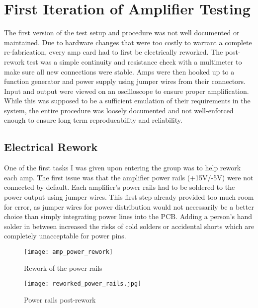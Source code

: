 %
%
\chapter{First Iteration of Amplifier Testing}
The first version of the test setup and procedure was not well documented or maintained. Due to hardware changes that were too costly to warrant a complete re-fabrication, every amp card had to first be electrically reworked. The post-rework test was a simple continuity and resistance check with a multimeter to make sure all new connections were stable. Amps were then hooked up to a function generator and power supply using jumper wires from their connectors. Input and output were viewed on an oscilloscope to ensure proper amplification. While this was supposed to be a sufficient emulation of their requirements in the system, the entire procedure was loosely documented and not well-enforced enough to ensure long term reproducability and reliability.
\section{Electrical Rework}
One of the first tasks I was given upon entering the group was to help rework each amp. The first issue was that the amplifier power rails (+15V/-5V) were not connected by default. Each amplifier's power rails had to be soldered to the power output using jumper wires. This first step already provided too much room for error, as jumper wires for power distribution would not necessarily be a better choice than simply integrating power lines into the PCB. Adding a person's hand solder in between increased the risks of cold solders or accidental shorts which are completely unacceptable for power pins. \par
\begin{figure}[!htb]
	\texttt{[image: amp\_power\_rework]}
	\centering
	\caption{Rework of the power rails}
	\centering
	\texttt{[image: reworked\_power\_rails.jpg]}
	\centering
	\caption{Power rails post-rework}
\end{figure}
